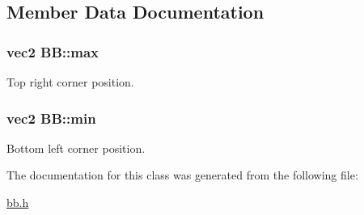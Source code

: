 \subsection{Member Data Documentation}
\hypertarget{class_b_b_a460ea90989913b4fe860f404404ef650}{
\subsubsection[{max}]{\setlength{\rightskip}{0pt plus 5cm}vec2 B\+B\+::max}}\label{class_b_b_a460ea90989913b4fe860f404404ef650}


Top right corner position. 

\hypertarget{class_b_b_ae7c37d7bd7024bf0077ab1b884aac982}{
\subsubsection[{min}]{\setlength{\rightskip}{0pt plus 5cm}vec2 B\+B\+::min}}\label{class_b_b_ae7c37d7bd7024bf0077ab1b884aac982}


Bottom left corner position. 



The documentation for this class was generated from the following file\+:\begin{DoxyCompactItemize}
\item 
\hyperlink{bb_8h}{bb.\+h}\end{DoxyCompactItemize}
